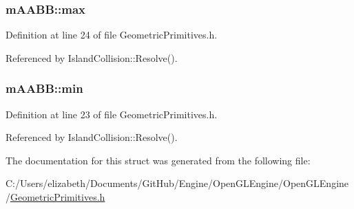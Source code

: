 \subsubsection[{\texorpdfstring{max}{max}}]{ m\+A\+A\+B\+B\+::max}\hypertarget{structm_a_a_b_b_a9866d0a5a3ceb5dbff2bf87372f3094a}{}\label{structm_a_a_b_b_a9866d0a5a3ceb5dbff2bf87372f3094a}


Definition at line 24 of file Geometric\+Primitives.\+h.



Referenced by Island\+Collision\+::\+Resolve().

\subsubsection[{\texorpdfstring{min}{min}}]{ m\+A\+A\+B\+B\+::min}\hypertarget{structm_a_a_b_b_af759d65b18f76e266945883107dcafc8}{}\label{structm_a_a_b_b_af759d65b18f76e266945883107dcafc8}


Definition at line 23 of file Geometric\+Primitives.\+h.



Referenced by Island\+Collision\+::\+Resolve().



The documentation for this struct was generated from the following file\+:\begin{DoxyCompactItemize}
\item 
C\+:/\+Users/elizabeth/\+Documents/\+Git\+Hub/\+Engine/\+Open\+G\+L\+Engine/\+Open\+G\+L\+Engine/\hyperlink{_geometric_primitives_8h}{Geometric\+Primitives.\+h}\end{DoxyCompactItemize}
